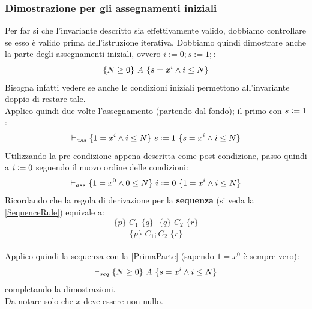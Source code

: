 \begin{esempio}
				      				\subsubsection{Dimostrazione per gli assegnamenti iniziali}
				      				Per far si che l'invariante descritto sia effettivamente valido, dobbiamo controllare se esso è valido prima dell'istruzione iterativa.
				      				Dobbiamo quindi dimostrare anche la parte degli assegnamenti iniziali, ovvero $i := 0; s := 1;$:
				      				\begin{align}
				      					\{N\geq 0\}\mbox{ \textit{A} }\{s=x^i\land i\leq N\} 
				      					\label{PrimaParte}                                   
				      				\end{align}
				      				Bisogna infatti vedere se anche le condizioni iniziali permettono
				      				all'invariante doppio di restare tale.\\
				      				Applico quindi due volte l'assegnamento (partendo dal fondo); il primo con
				      				$s\cceq 1$: 
				      				\[\vdash_{ass}\{1=x^i\land i\leq N\}\mbox{ $s\cceq 1$ }\{s=x^i\land i\leq N\}\]
				      				Utilizzando la pre-condizione appena descritta come post-condizione, passo quindi a $i\cceq 0$ seguendo il nuovo ordine delle condizioni:
				      				\[\vdash_{ass}\{1=x^0\land 0\leq N\}\mbox{ $i\cceq 0$ }\{1=x^i\land i\leq N\}\]
				      				Ricordando che la regola di derivazione per la \textbf{sequenza} (si veda la \ref{SequenceRule}) equivale a:   \[\frac{\{p\}\,\,C_1\,\,\{q\}\,\,
				      					\,\,\{q\}\,\,C_2\,\,\{r\}}{\{p\}\,\,C_1;C_2\,\,\{r\}}\] \\Applico quindi la sequenza con la \ref{PrimaParte} (sapendo $1=x^0$ è sempre vero):
				      				\[\vdash_{seq}\{N\geq 0\}\mbox{ \textit{A} }\{s=x^i\land i\leq N\}\]
				      				completando la dimostrazioni.\\
				      				Da notare solo che $x$ deve essere non nullo.
				      				\end{esempio}
